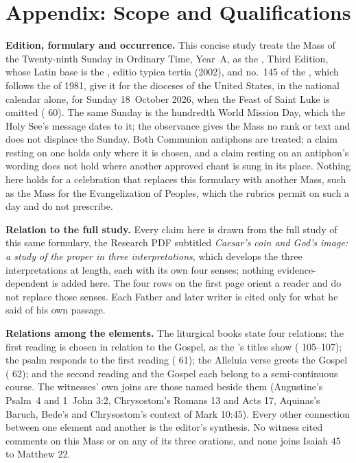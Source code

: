 
\section{Appendix: Scope and Qualifications}

{\footnotesize
\textbf{Edition, formulary and occurrence.} This concise study treats the Mass
of the Twenty-ninth Sunday in Ordinary Time, Year~A, as the , Third Edition, whose Latin base is the , editio
typica tertia (2002), and no.~145 of the , which follows the  of 1981, give it for the dioceses of the United States, in
the national calendar alone, for Sunday 18~October 2026, when the Feast of
Saint Luke is omitted ( 60). The same Sunday is the
hundredth World Mission Day, which the Holy See's message dates to it; the
observance gives the Mass no rank or text and does not displace the Sunday.
Both Communion antiphons are treated; a claim resting on one holds only where
it is chosen, and a claim resting on an antiphon's wording does not hold where
another approved chant is sung in its place. Nothing here holds for a
celebration that replaces this formulary with another Mass, such as the Mass
for the Evangelization of Peoples, which the rubrics permit on such a day and
do not prescribe.

\textbf{Relation to the full study.} Every claim here is drawn from the full
study of this same formulary, the Research PDF subtitled \textit{Caesar's coin
and God's image: a study of the proper in three interpretations}, which
develops the three interpretations at length, each with its own four senses;
nothing evidence-dependent is added here. The four rows on the
first page orient a reader and do not replace those senses. Each Father and
later writer is cited only for what he said of his own passage.

\textbf{Relations among the elements.} The liturgical books state four
relations: the first reading is chosen in relation to the Gospel, as the
's titles show ( 105--107); the psalm responds to
the first reading ( 61); the Alleluia verse greets
the Gospel ( 62); and the second reading
and the Gospel each belong to a semi-continuous course. The witnesses' own
joins are those named beside them (Augustine's Psalm~4 and 1~John 3:2,
Chrysostom's Romans 13 and Acts 17, Aquinas's Baruch, Bede's and Chrysostom's
context of Mark 10:45). Every other connection between
one element and another is the editor's synthesis. No witness cited comments
on this Mass or on any of its three orations, and none joins Isaiah 45 to
Matthew 22.

}
